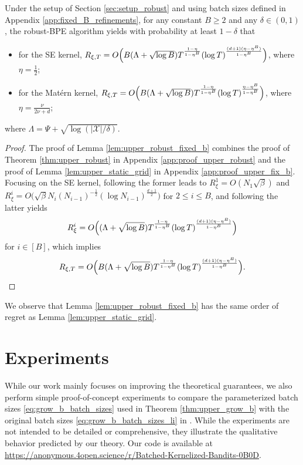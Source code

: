 \documentclass[10pt]{article}
\begin{document}
\begin{lemma}
    \label{lem:upper_robust_fixed_b}
    Under the setup of Section \ref{sec:setup_robust} and using batch sizes defined in Appendix \ref{app:fixed_B_refinements},
    for any constant $B\geq 2$ and any $\delta \in (0,1)$,
    the robust-BPE algorithm yields with probability at least $1-\delta$ that
    \begin{itemize}
        \item for the SE kernel, $R_{\xi,T} = O \Bigl( B(\Lambda+\sqrt{\log B}) T^{\frac{1-\eta}{1-\eta^B}} (\log T)^{\frac{(d+1)(\eta-\eta^B)}{1-\eta^B}}\Bigr)$, where $\eta=\frac{1}{2}$;
        \item for the Mat\'ern kernel, $R_{\xi,T} = O \Bigl( B(\Lambda+\sqrt{\log B}) T^{\frac{1-\eta}{1-\eta^B}} (\log T)^{\frac{\eta-\eta^B}{1-\eta^B}}\Bigr)$, where $\eta = \frac{\nu}{2\nu+d}$;
    \end{itemize}
    where $\Lambda=\Psi+\sqrt{\log(|\mathcal{X}|/\delta)}$.    
\end{lemma}

\begin{proof}
    The proof of Lemma \ref{lem:upper_robust_fixed_b} combines the proof of Theorem \ref{thm:upper_robust} in Appendix \ref{app:proof_upper_robust} and the proof of Lemma \ref{lem:upper_static_grid} in Appendix \ref{app:proof_upper_fix_b}. Focusing on the SE kernel, following the former leads to
    $R_{\xi}^1 = O (N_1\sqrt{\beta})$ and
    $R_{\xi}^i = O\bigl(\sqrt{\beta} N_i(N_{i-1})^{-\frac{1}{2}}(\log N_{i-1})^{\frac{d+1}{2}}\bigr)$ for $2\leq i \leq B$, and following the latter yields 
    \begin{align}
        R_{\xi}^i = O\Bigl((\Lambda+\sqrt{\log B})T^{\frac{1-\eta}{1-\eta^B}}(\log T)^{\frac{(d+1)(\eta- \eta^B)}{1-\eta^B}}\Bigr)
    \end{align}
    for $i\in [B]$, which implies
    \begin{align}
        R_{\xi,T} = O\Bigl(B(\Lambda+\sqrt{\log B})T^{\frac{1-\eta}{1-\eta^B}}(\log T)^{\frac{(d+1)(\eta- \eta^B)}{1-\eta^B}}\Bigr).
    \end{align}
\end{proof}

We observe that Lemma \ref{lem:upper_robust_fixed_b} has the same order of regret as Lemma \ref{lem:upper_static_grid}.

\section{Experiments}
\label{app:experiments}
While our work mainly focuses on improving the theoretical guarantees, we also perform simple proof-of-concept experiments to compare the parameterized batch sizes \eqref{eq:grow_b_batch_sizes} used in Theorem \ref{thm:upper_grow_b} with the original batch sizes \eqref{eq:grow_b_batch_sizes_li} in \citep{Li22}. While the experiments are not intended to be detailed or comprehensive, they illustrate the qualitative behavior predicted by our theory. 
Our code is available at \url{https://anonymous.4open.science/r/Batched-Kernelized-Bandits-0B0D}.
\end{document}
